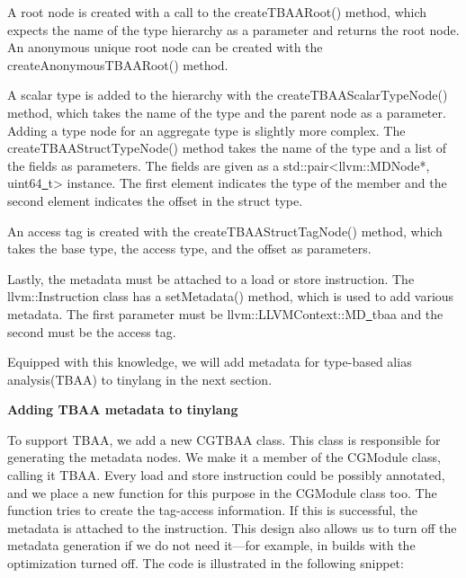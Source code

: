 A root node is created with a call to the createTBAARoot() method, which expects the name of the type hierarchy as a parameter and returns the root node. An anonymous unique root node can be created with the createAnonymousTBAARoot() method.\par

A scalar type is added to the hierarchy with the createTBAAScalarTypeNode() method, which takes the name of the type and the parent node as a parameter. Adding a type node for an aggregate type is slightly more complex. The createTBAAStructTypeNode() method takes the name of the type and a list of the fields as parameters. The fields are given as a std::pair<llvm::MDNode*, uint64\underline{~}t> instance. The first element indicates the type of the member and the second element indicates the offset in the struct type.\par

An access tag is created with the createTBAAStructTagNode() method, which takes the base type, the access type, and the offset as parameters.\par

Lastly, the metadata must be attached to a load or store instruction. The llvm::Instruction class has a setMetadata() method, which is used to add various metadata. The first parameter must be llvm::LLVMContext::MD\underline{~}tbaa and the second must be the access tag.\par

Equipped with this knowledge, we will add metadata for type-based alias analysis(TBAA) to tinylang in the next section.\par

\hspace*{\fill} \par %
\textbf{Adding TBAA metadata to tinylang}

To support TBAA, we add a new CGTBAA class. This class is responsible for generating the metadata nodes. We make it a member of the CGModule class, calling it TBAA. Every load and store instruction could be possibly annotated, and we place a new function for this purpose in the CGModule class too. The function tries to create the tag-access information. If this is successful, the metadata is attached to the instruction. This design also allows us to turn off the metadata generation if we do not need it—for example, in builds with the optimization turned off. The code is illustrated in the following snippet:\par

